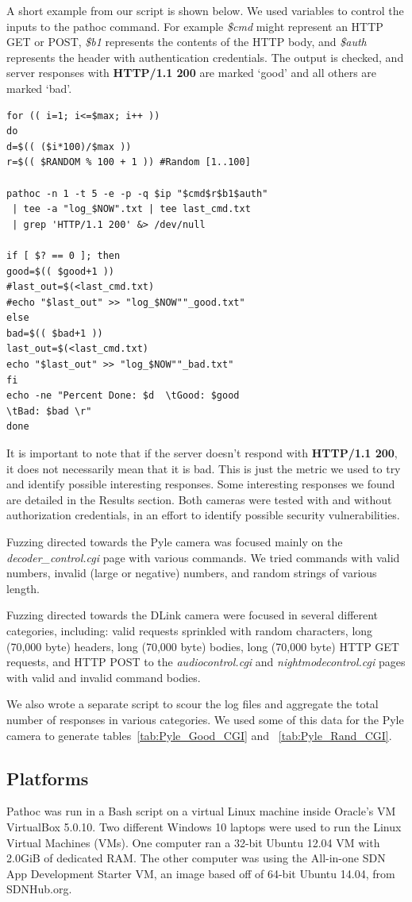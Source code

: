 \documentclass[letterpaper,twocolumn,10pt]{article}
\begin{document}
A short example from our script is shown below. We used variables to control the inputs to the pathoc command. For example \textit{\$cmd} might represent an HTTP GET or POST, \textit{\$b1} represents the contents of the HTTP body, and \textit{\$auth} represents the header with authentication credentials. The output is checked, and server responses with \textbf{HTTP/1.1 200} are marked `good' and all others are marked `bad'. 
\begin{verbatim}
for (( i=1; i<=$max; i++ ))
do	
d=$(( ($i*100)/$max ))
r=$(( $RANDOM % 100 + 1 )) #Random [1..100]

pathoc -n 1 -t 5 -e -p -q $ip "$cmd$r$b1$auth"
 | tee -a "log_$NOW".txt | tee last_cmd.txt
 | grep 'HTTP/1.1 200' &> /dev/null

if [ $? == 0 ]; then
good=$(( $good+1 ))
#last_out=$(<last_cmd.txt)
#echo "$last_out" >> "log_$NOW""_good.txt"
else
bad=$(( $bad+1 ))
last_out=$(<last_cmd.txt)
echo "$last_out" >> "log_$NOW""_bad.txt"
fi		
echo -ne "Percent Done: $d  \tGood: $good   
\tBad: $bad \r"
done
\end{verbatim}

It is important to note that if the server doesn't respond with \textbf{HTTP/1.1 200}, it does not necessarily mean that it is bad. This is just the metric we used to try and identify possible interesting responses. Some interesting responses we found are detailed in the Results section. Both cameras were tested with and without authorization credentials, in an effort to identify possible security vulnerabilities. 

Fuzzing directed towards the Pyle camera was focused mainly on the \textit{decoder\_control.cgi} page with various commands. We tried commands with valid numbers, invalid (large or negative) numbers, and random strings of various length. 

Fuzzing directed towards the DLink camera were focused in several different categories, including: valid requests sprinkled with random characters, long (70,000 byte) headers, long (70,000 byte) bodies, long (70,000 byte) HTTP GET requests, and HTTP POST to the \textit{audiocontrol.cgi} and \textit{nightmodecontrol.cgi} pages with valid and invalid command bodies. 

We also wrote a separate script to scour the log files and aggregate the total number of responses in various categories. We used some of this data for the Pyle camera to generate tables~\ref{tab:Pyle_Good_CGI} and ~\ref{tab:Pyle_Rand_CGI}. 


\subsection{Platforms}
Pathoc was run in a Bash script on a virtual Linux machine inside Oracle's VM VirtualBox 5.0.10. Two different Windows 10 laptops were used to run the  Linux Virtual Machines (VMs). One computer ran a 32-bit Ubuntu 12.04 VM with 2.0GiB of dedicated RAM. The other computer was using the All-in-one SDN App Development Starter VM, an image based off of 64-bit Ubuntu 14.04, from SDNHub.org.
\end{document}
